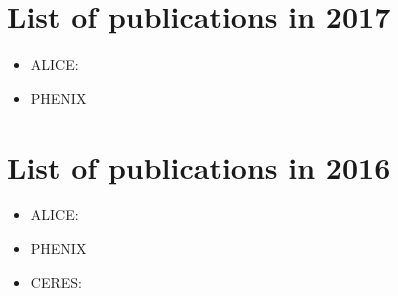 \documentclass[12pt]{article}
\begin{document}
\clearpage


\section{List of publications in 2017}

\begin{itemize}
\item ALICE:
\cite{
Acharya:2017zfg,
Adam:2017ucq,
Adamova:2017opl,
Acharya:2017hdv,
Acharya:2017hyu,
Acharya:2017jgo,
Acharya:2017hjh,
Adam:2017zbf,
Adamova:2017elh,
Adam:2016iwf,
Adam:2016ddh,
Alice:2016wka,
Adam:2016ilk,
Adam:2016khe,
Adam:2016ckp,
Adam:2016tsv,
Adam:2016wyz,
Adam:2016rdg,
ALICE:2017jyt,
ALICE:2016clc,
Adam:2015gka,
Adam:2015jca,
Adam:2015nna}

\item PHENIX
\cite{
Aidala:2017pum,
Adare:2017caq,
Aidala:2017iad,
Adare:2016jta,
Adare:2016psx,
Adare:2016bug}

\end{itemize}


\section{List of publications in 2016}

\begin{itemize}
\item ALICE:
\cite{
Adam:2016ssk,
Adam:2016ich,
ALICE:2016kpq,
Adam:2016jfp,
Adam:2016ohd,
Adam:2016mkz,
Adam:2016acv,
Adam:2016izf,
Adam:2016bpr,
Adam:2016dau,
Adam:2015pbc,
Adam:2015vsf,
Adam:2015ptt,
Adam:2015vje,
Adam:2015gba,
Adam:2015pza,
Adam:2015rta,
Adam:2015qda,
Adam:2015mda,
Adam:2015lda,
Adam:2015kda,
Adam:2015jda,
Adam:2015gda,
Adam:2015sza,
ALICE:2015wfa,
Adam:2015vna,
Adam:2015eta,
Adam:2015pga,
Adam:2015vda,
Adam:2015isa,
Adam:2015yta,
Adam:2015bka,
Adam:2015nca,
Adam:2015kca}


\item PHENIX
\cite{
Adare:2016cqe,
Adare:2015ozj,
Adare:2015cpn,
Adare:2015lcd,
Adare:2015cua,
Adare:2015bua,
Adare:2015ema,
Adare:2015hva,
Adare:2015ila,
Adare:2015hla,
Adare:2015gla,
Adare:2015aqk,
Adare:2015gsd,
Adare:2014kci}

\item CERES:
\cite{Milosevic:2016kpl}

\end{itemize}
\end{document}
